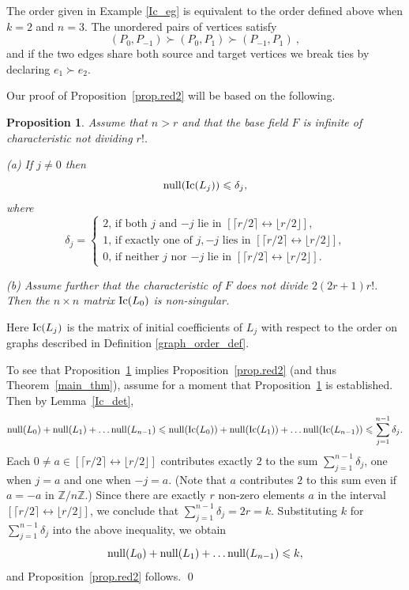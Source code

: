 \documentclass{amsproc}
\newtheorem{proposition}[theorem]{Proposition}
\theoremstyle{definition}
\theoremstyle{remark}
\numberwithin{equation}{section}
\newcommand{\Z}{{\mathbb Z}}
\newcommand{\Ic}{{\rm Ic}}
\newcommand{\nullity}{{\rm null}}
\newcommand{\interval}{\longleftrightarrow}
\begin{document}
The order given in Example \ref{Ic_eg} is equivalent to the order defined above when $k=2$ and $n=3$. The unordered pairs of vertices satisfy
\[(P_0,P_{-1})\succ(P_0,P_1)\succ (P_{-1},P_1)\ ,\]
and if the two edges share both source and target vertices we break ties by declaring $e_1\succ e_2$.

\smallskip
Our proof of Proposition~\ref{prop.red2} will be based on the following.

\begin{proposition}\label{Ic_L_j_ker}
Assume that $n>r$ and that the base field $F$ is infinite of characteristic not dividing $r!$.

\smallskip
(a) If $j \neq 0$ then \[ \nullity (\Ic(L_j))\leqslant \delta_j, \]
where
\[ \delta_j = \begin{cases} \text{$2$, if both $j$ and $-j$ lie in $[\lceil r/2 \rceil \interval \lfloor r/2 \rfloor]$, } \\
\text{$1$, if exactly one of $j, -j$ lies in $[\lceil r/2 \rceil \interval \lfloor r/2 \rfloor]$,} \\
\text{$0$, if neither $j$ nor $-j$ lie in $[\lceil r/2 \rceil \interval \lfloor r/2 \rfloor]$.}
\end{cases}
\]

\smallskip
(b) Assume further that the characteristic of $F$ does not divide $2(2r+1)r!$. Then the $n \times n$ matrix $\Ic(L_0)$ is non-singular.
\end{proposition}

Here $\Ic(L_j)$ is the matrix of initial coefficients of $L_j$ with respect to the order on graphs described in Definition \ref{graph_order_def}.

To see that Proposition~\ref{Ic_L_j_ker} implies Proposition~\ref{prop.red2} (and thus Theorem~\ref{main_thm}),
assume for a moment that Proposition~\ref{Ic_L_j_ker} is established. Then by Lemma~\ref{Ic_det}, 
\[ \nullity(L_0) + \nullity(L_1) + \ldots \nullity(L_{n-1}) \leqslant
\nullity(\Ic(L_0)) + \nullity(\Ic(L_1)) + \ldots \nullity(\Ic(L_{n-1})) \leqslant \sum_{j = 1}^{n-1} \delta_j. \]
Each $0 \neq a \in [\lceil r/2 \rceil \interval \lfloor r/2 \rfloor]$ contributes exactly $2$ to the sum
$\sum_{j = 1}^{n-1} \delta_j$, one when $j = a$ and one when $-j = a$. (Note that $a$ contributes $2$ to this sum even if $a = -a$ in $\Z/ n \Z$.)
Since there are exactly $r$ non-zero elements $a$ in the interval $[\lceil r/2 \rceil \interval \lfloor r/2 \rfloor]$, we conclude that
$\sum_{j = 1}^{n-1} \delta_j = 2r = k$. Substituting $k$ for $\sum_{j = 1}^{n-1} \delta_j$ into the above inequality, we obtain 
\[ \nullity(L_0) + \nullity(L_1) + \ldots \nullity(L_{n-1}) \leqslant k, \]
and Proposition~\ref{prop.red2} follows.
\qed
\end{document}
